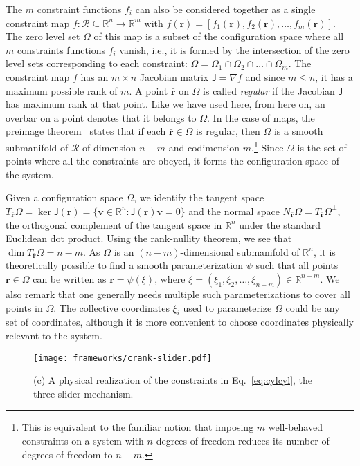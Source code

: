 The $m$ constraint functions $f_i$ can also be considered together as a single constraint map $f: \mathscr{R} \subseteq \mathbb{R}^n \to \mathbb{R}^m$ with $f(\bm{r}) = [f_1(\bm{r}), f_2(\bm{r}), \dots, f_m(\bm{r})]$.
The zero level set $\Omega$ of this map is a subset of the configuration space where all $m$ constraints functions $f_i$ vanish, i.e., it is formed by the intersection of the zero level sets corresponding to each constraint: $\Omega = \Omega_1 \cap \Omega_2 \cap \dots \cap \Omega_m$.
The constraint map $f$ has an $m\times n$ Jacobian matrix $\mathsf{J} = \nabla f$ and since $m\leq n$, it has a maximum possible rank of $m$.
A point $\bar{\bm{r}}$ on $\Omega$ is called \emph{regular} if the Jacobian $\mathsf{J}$ has maximum rank at that point.
Like we have used here, from here on, an overbar on a point denotes that it belongs to $\Omega$.
In the case of maps, the preimage theorem~\cite{lee2013} states that if each $\bar{\bm{r}} \in \Omega$ is regular, then $\Omega$ is a smooth submanifold of $\mathscr{R}$ of dimension $n - m$ and codimension $m$.\footnote{This is equivalent to the familiar notion that imposing $m$ well-behaved constraints on a system with $n$ degrees of freedom reduces its number of degrees of freedom to $n-m$.}
Since $\Omega$ is the set of points where all the constraints are obeyed, it forms the configuration space of the system.

Given a configuration space $\Omega$, we identify the tangent space $T_{\bar{\bm{r}}}\Omega = \ker{\mathsf{J}(\bar{\bm{r}})} = \{\bm{v} \in \mathbb{R}^n: \mathsf{J}(\bar{\bm{r}})\bm{v} = 0\}$ and the normal space $N_{\bar{\bm{r}}}\Omega = T_{\bar{\bm{r}}}\Omega^\perp$, the orthogonal complement of the tangent space in $\mathbb{R}^n$ under the standard Euclidean dot product.
Using the rank-nullity theorem, we see that $\dim T_{\bar{\bm{r}}}\Omega = n-m$.
As $\Omega$ is an $(n-m)$-dimensional submanifold of $\mathbb{R}^n$, it is theoretically possible to find a smooth parameterization $\psi$ such that all points $\bar{\bm{r}} \in \Omega$ can be written as $\bar{\bm{r}} = \psi(\xi)$, where $\xi = (\xi_1, \xi_2, \ldots, \xi_{n-m}) \in \mathbb{R}^{n-m}$.
We also remark that one generally needs multiple such parameterizations to cover all points in $\Omega$.
The collective coordinates $\xi_i$ used to parameterize $\Omega$ could be any set of coordinates, although it is more convenient to choose coordinates physically relevant to the system.
%
\begin{figure}
  \begin{center}
    \texttt{[image: frameworks/crank-slider.pdf]}
  \end{center}
  \caption{(c) A physical realization of the constraints in Eq.~\eqref{eq:cylcyl}, the three-slider mechanism.}
  \label{fig:slider}
\end{figure}

